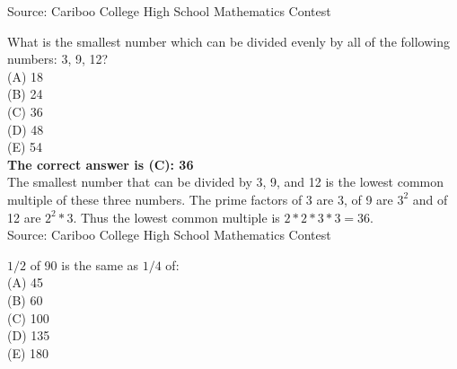 \documentclass{article}
\begin{document}
\parindent=0cm
\parskip=6pt
\pagestyle{empty}


\scriptsize
Source: Cariboo College High School Mathematics Contest

\normalsize
What is the smallest number which can be divided evenly by all of the following numbers: 3, 9, 12?\\
(A) 18\\
(B) 24\\
(C) 36\\
(D) 48\\
(E) 54\\


\textbf{The correct answer is (C): 36}\\[1 ex]
The smallest number that can be divided by 3, 9, and 12 is the lowest common multiple of these three numbers.  The prime factors of 3 are 3, of 9 are $3^2$ and of 12 are $2^2*3$.
Thus the lowest common multiple is $2*2*3*3=36$.
\\[5 ex]

\scriptsize
Source: Cariboo College High School Mathematics Contest

\normalsize
$1/2$ of 90 is the same as $1/4$ of:\\
(A) 45\\
(B) 60\\
(C) 100\\
(D) 135\\
(E) 180\\
\end{document}
